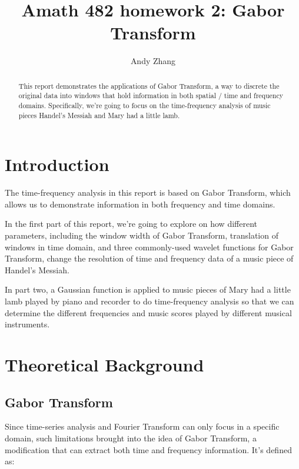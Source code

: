 \documentclass[10pt]{article}
\begin{document}
\title{Amath 482 homework 2: Gabor Transform}
\author{Andy Zhang}
\maketitle

\begin{abstract}
This report demonstrates the applications of Gabor Transform, a way to discrete the original data into windows that hold information in both spatial / time and frequency domains. Specifically, we're going to focus on the time-frequency analysis of music pieces Handel's Messiah and Mary had a little lamb.
\end{abstract}

\section{Introduction}
The time-frequency analysis in this report is based on Gabor Transform, which allows us to demonstrate information in both frequency and time domains.
\par

In the first part of this report, we're going to explore on how different parameters, including the window width of Gabor Transform, translation of windows in time domain, and three commonly-used wavelet functions for Gabor Transform, change the resolution of time and frequency data of a music piece of Handel's Messiah. 
\par

In part two, a Gaussian function is applied to music pieces of Mary had a little lamb played by piano and recorder to do time-frequency analysis so that we can determine the different frequencies and music scores played by different musical instruments.


\section{Theoretical Background}
\subsection{Gabor Transform}
Since time-series analysis and Fourier Transform can only focus in a specific domain, such limitations brought into the idea of Gabor Transform, a modification that can extract both time and frequency information. It's defined as:
\end{document}
